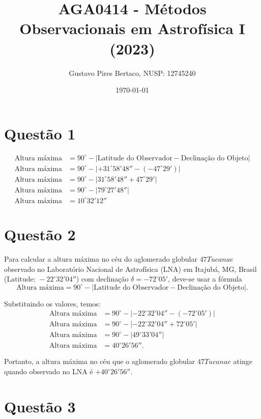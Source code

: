 \documentclass[a4paper, 12pt]{article}
\title{AGA0414 - Métodos Observacionais em Astrofísica I (2023)}
\author{Gustavo Pires Bertaco, NUSP: 12745240}
\date{\today}
\begin{document}
\maketitle

\section*{Questão 1}

\begin{align*}
\text{Altura máxima} &= 90^\circ - \left| \text{Latitude do Observador} - \text{Declinação do Objeto} \right| \\
\text{Altura máxima} &= 90^\circ - \left| +31^\circ 58' 48'' - (-47^\circ 29') \right| \\
\text{Altura máxima} &= 90^\circ - \left| 31^\circ 58' 48'' + 47^\circ 29' \right| \\
\text{Altura máxima} &= 90^\circ - \left| 79^\circ 27' 48'' \right| \\
\text{Altura máxima} &= 10^\circ 32' 12''
\end{align*}

\section*{Questão 2}

Para calcular a altura máxima no céu do aglomerado globular \(47Tucanae\) observado no Laboratório Nacional de Astrofísica (LNA) em Itajubá, MG, Brasil (\(\text{Latitude: } -22^\circ 32' 04''\)) com declinação \(\delta = -72^\circ 05'\), deve-se usar a fórmula 
\[
\text{Altura máxima} = 90^\circ - \left| \text{Latitude do Observador} - \text{Declinação do Objeto} \right|.
\]

Substituindo os valores, temos:
\begin{align*}
\text{Altura máxima} &= 90^\circ - \left| -22^\circ 32' 04'' - (-72^\circ 05') \right| \\
\text{Altura máxima} &= 90^\circ - \left| -22^\circ 32' 04'' + 72^\circ 05' \right| \\
\text{Altura máxima} &= 90^\circ - \left| 49^\circ 33' 04'' \right| \\
\text{Altura máxima} &= 40^\circ 26' 56''.
\end{align*}

Portanto, a altura máxima no céu que o aglomerado globular \(47Tucanae\) atinge quando observado no LNA é \(+40^\circ 26' 56''\).


\section*{Questão 3}
\end{document}

